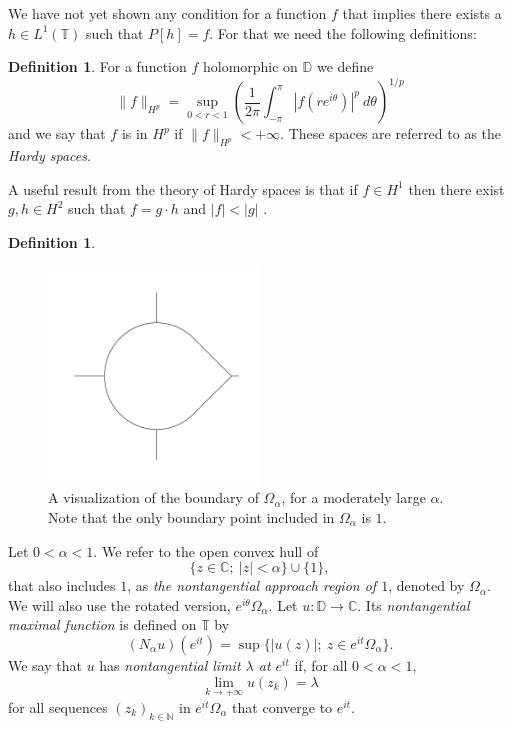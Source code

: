 \documentclass[a4paper,12pt,twoside,BCOR=10mm]{scrbook}
\theoremstyle{definition}
\theoremstyle{definition}
\theoremstyle{definition}
\newtheorem{definition}[theorem]{Definition}
\begin{document}
We have not yet shown any condition for a function $f$ that implies there exists a $h \in L^1(\mathbb{T})$ such that $P[h] = f$.
For that we need the following definitions:
\begin{definition}
\label{index24}
For a function $f$ holomorphic on $\mathbb{D}$ we define
\[
	\|f\|_{H^p} = 
	\sup_{0 < r < 1} \left ( \frac{1}{2\pi}\int_{-\pi}^{\pi} |f(re^{i\theta})|^p\ d\theta \right )^{1/p}
\]
and we say that $f$ is in $H^p$ if $\|f\|_{H^p} < +\infty$.
These spaces are referred to as the \emph{Hardy spaces}.
\end{definition}
A useful result from the theory of Hardy spaces is that if $f \in H^1$ then there exist $g, h \in H^2$ such that $f = g \cdot h$ and $|f| < |g|$ \citep[Theorem $17.10$]{rudin2}.
\begin{definition}
\label{index25}
\begin{figure}[h]
\centering
\includegraphics[width=0.5\textwidth]{approach-region-7-boundary}
\caption{A visualization of the boundary of $\Omega_{\alpha}$, for a moderately large $\alpha$. Note that the only boundary point included in $\Omega_{\alpha}$ is $1$. }
\end{figure}
Let $0 < \alpha < 1$.
We refer to the open convex hull of
\[
	\{z \in \mathbb{C};\ |z| < \alpha\} \cup \{1\},
\]
that also includes $1$, as \emph{the nontangential approach region of $1$}, denoted by $\Omega_{\alpha}$.
We will also use the rotated version, $e^{i\theta}\Omega_{\alpha}$.
Let $u: \mathbb{D} \rightarrow \mathbb{C}$.
Its \emph{nontangential maximal function} is defined on $\mathbb{T}$ by
\[
	(N_{\alpha}u)(e^{it}) = \sup \{|u(z)|;\ z \in e^{it}\Omega_{\alpha}\}.
\]
We say that $u$ has \emph{nontangential limit $\lambda$ at $e^{it}$} if, for all $0 < \alpha < 1$,
\[
	\lim_{k \rightarrow +\infty} u(z_k) = \lambda
\]
for all sequences $(z_k)_{k \in \mathbb{N}}$ in $e^{it}\Omega_{\alpha}$ that converge to $e^{it}$.
\end{definition}
\end{document}
